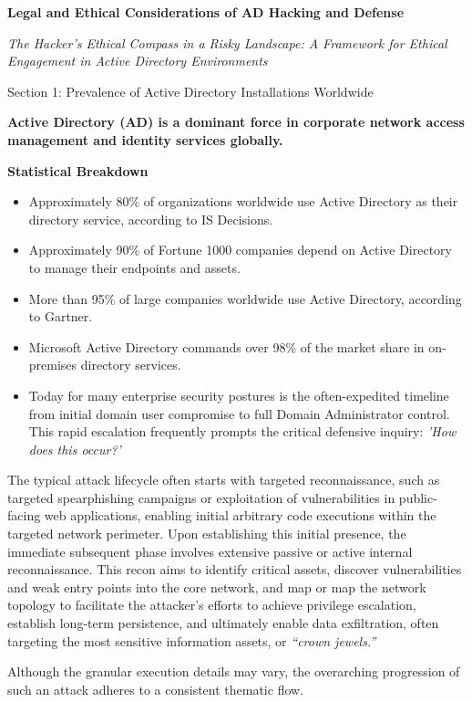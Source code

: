 
\textbf{Legal and Ethical Considerations of AD Hacking and Defense}

\textit{The Hacker’s Ethical Compass in a Risky Landscape: A Framework for Ethical Engagement in Active Directory Environments}

Section 1: Prevalence of Active Directory Installations Worldwide

\textbf{Active Directory (AD) is a dominant force in corporate network access management and identity services globally.}

\textbf{Statistical Breakdown}

\begin{itemize}
    \item Approximately 80\% of organizations worldwide use Active Directory as their directory service, according to IS Decisions.
    \item Approximately 90\% of Fortune 1000 companies depend on Active Directory to manage their endpoints and assets.
    \item More than 95\% of large companies worldwide use Active Directory, according to Gartner.
    \item Microsoft Active Directory commands over 98\% of the market share in on-premises directory services.
    \item 
Today for many enterprise security postures is the often-expedited timeline from initial domain user compromise to full Domain Administrator control. This rapid escalation frequently prompts the critical defensive inquiry: \textit{ 'How does this occur?'}
\end{itemize}
The typical attack lifecycle often starts with targeted reconnaissance, such as targeted spearphishing campaigns or exploitation of vulnerabilities in public-facing web applications, enabling initial arbitrary code executions within the targeted network perimeter. Upon establishing this initial presence, the immediate subsequent phase involves extensive passive or active internal reconnaissance. This recon aims to identify critical assets, discover vulnerabilities and weak entry points into the core network, and map or map the network topology to facilitate the attacker's efforts to achieve privilege escalation, establish long-term persistence, and ultimately enable data exfiltration, often targeting the most sensitive information assets, or \textit{“crown jewels.”}

Although the granular execution details may vary, the overarching progression of such an attack adheres to a consistent thematic flow.

